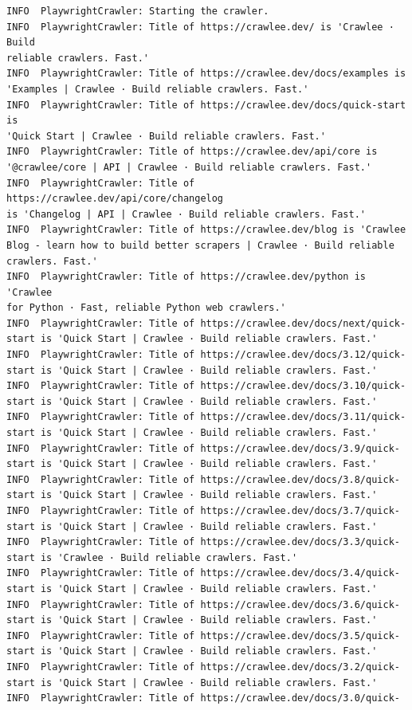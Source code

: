 \begin{verbatim}
INFO  PlaywrightCrawler: Starting the crawler.
INFO  PlaywrightCrawler: Title of https://crawlee.dev/ is 'Crawlee · Build
reliable crawlers. Fast.'
INFO  PlaywrightCrawler: Title of https://crawlee.dev/docs/examples is
'Examples | Crawlee · Build reliable crawlers. Fast.'
INFO  PlaywrightCrawler: Title of https://crawlee.dev/docs/quick-start is
'Quick Start | Crawlee · Build reliable crawlers. Fast.'
INFO  PlaywrightCrawler: Title of https://crawlee.dev/api/core is
'@crawlee/core | API | Crawlee · Build reliable crawlers. Fast.'
INFO  PlaywrightCrawler: Title of https://crawlee.dev/api/core/changelog
is 'Changelog | API | Crawlee · Build reliable crawlers. Fast.'
INFO  PlaywrightCrawler: Title of https://crawlee.dev/blog is 'Crawlee
Blog - learn how to build better scrapers | Crawlee · Build reliable
crawlers. Fast.'
INFO  PlaywrightCrawler: Title of https://crawlee.dev/python is 'Crawlee
for Python · Fast, reliable Python web crawlers.'
INFO  PlaywrightCrawler: Title of https://crawlee.dev/docs/next/quick-
start is 'Quick Start | Crawlee · Build reliable crawlers. Fast.'
INFO  PlaywrightCrawler: Title of https://crawlee.dev/docs/3.12/quick-
start is 'Quick Start | Crawlee · Build reliable crawlers. Fast.'
INFO  PlaywrightCrawler: Title of https://crawlee.dev/docs/3.10/quick-
start is 'Quick Start | Crawlee · Build reliable crawlers. Fast.'
INFO  PlaywrightCrawler: Title of https://crawlee.dev/docs/3.11/quick-
start is 'Quick Start | Crawlee · Build reliable crawlers. Fast.'
INFO  PlaywrightCrawler: Title of https://crawlee.dev/docs/3.9/quick-
start is 'Quick Start | Crawlee · Build reliable crawlers. Fast.'
INFO  PlaywrightCrawler: Title of https://crawlee.dev/docs/3.8/quick-
start is 'Quick Start | Crawlee · Build reliable crawlers. Fast.'
INFO  PlaywrightCrawler: Title of https://crawlee.dev/docs/3.7/quick-
start is 'Quick Start | Crawlee · Build reliable crawlers. Fast.'
INFO  PlaywrightCrawler: Title of https://crawlee.dev/docs/3.3/quick-
start is 'Crawlee · Build reliable crawlers. Fast.'
INFO  PlaywrightCrawler: Title of https://crawlee.dev/docs/3.4/quick-
start is 'Quick Start | Crawlee · Build reliable crawlers. Fast.'
INFO  PlaywrightCrawler: Title of https://crawlee.dev/docs/3.6/quick-
start is 'Quick Start | Crawlee · Build reliable crawlers. Fast.'
INFO  PlaywrightCrawler: Title of https://crawlee.dev/docs/3.5/quick-
start is 'Quick Start | Crawlee · Build reliable crawlers. Fast.'
INFO  PlaywrightCrawler: Title of https://crawlee.dev/docs/3.2/quick-
start is 'Quick Start | Crawlee · Build reliable crawlers. Fast.'
INFO  PlaywrightCrawler: Title of https://crawlee.dev/docs/3.0/quick-

\end{verbatim}
